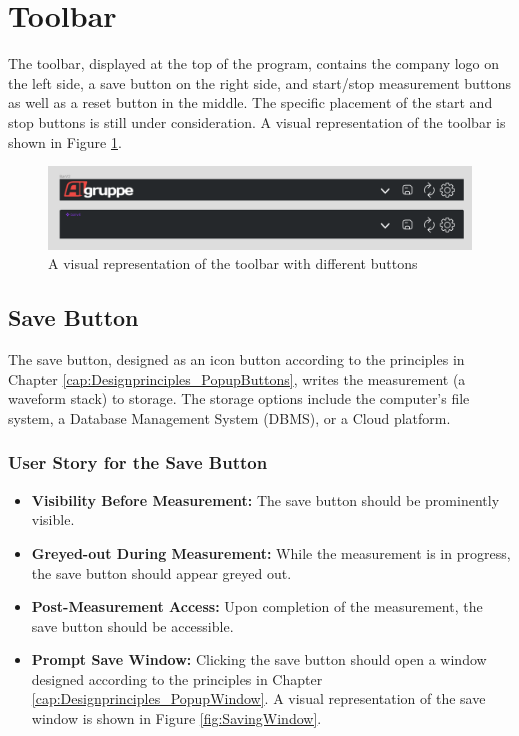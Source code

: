 \documentclass[]{scrreprt}
\begin{document}
\section{Toolbar}

The toolbar, displayed at the top of the program, contains the company logo on the left side, 
a save button on the right side, and start/stop measurement buttons as well as a reset button in the middle. 
The specific placement of the start and stop buttons is still under consideration. A visual representation of the toolbar is shown in Figure \ref{fig:toolbar}.

\begin{figure}
\includegraphics[width=.9\textwidth]{assets/pictures/Toolbar states.png}
\caption[]{A visual representation of the toolbar with different buttons}
\label{fig:toolbar}
\end{figure}

\subsection{Save Button}
The save button, designed as an icon button according to the principles in Chapter \ref{cap:Designprinciples_PopupButtons},
 writes the measurement (a waveform stack) to storage. The storage options include the computer's file system, a Database Management System (DBMS), or a Cloud platform.

\subsubsection{User Story for the Save Button}
\begin{itemize}
\item \textbf{Visibility Before Measurement:} The save button should be prominently visible.
\item \textbf{Greyed-out During Measurement:} While the measurement is in progress, the save button should appear greyed out.
\item \textbf{Post-Measurement Access:} Upon completion of the measurement, the save button should be accessible.
\item \textbf{Prompt Save Window:} Clicking the save button should open a window designed according to the principles in Chapter \ref{cap:Designprinciples_PopupWindow}.
 A visual representation of the save window is shown in Figure \ref{fig:SavingWindow}.
\end{itemize}
\end{document}
